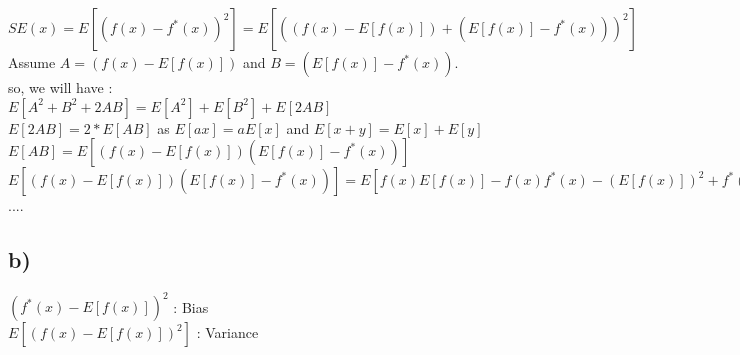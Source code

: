 \documentclass[10pt,a4paper]{article}
\begin{document}
$SE(x) = E[(f(x)-f^{*}(x))^{2}] = E[( (f(x)-E[f(x)]) +  (E[f(x)]-f^{*}(x)))^{2}]$\\
Assume $ A = (f(x)-E[f(x)])$ and $B = (E[f(x)]-f^{*}(x))$.\\
 so, we will have : \\
$E[A^2+B^2+ 2A B] = E[A^{2}] + E[B^{2}] + E[2 A B] $ \\
$E[2 A B] = 2 * E[A B]$  as $E[ax] = a E[x]$ and $E[x+y] = E[x]+E[y]$\\
$E[A B] = E[(f(x)-E[f(x)])(E[f(x)]-f^{*}(x))] $ \\
$E[ (f(x)-E[f(x)])(E[f(x)]-f^{*}(x))] = E[f(x)E[f(x)] - f(x)f^*(x) - (E[f(x)])^{2} + f^{*}(x) E[f(x)] ] = E[f(x).E[f(x)]] - E[f(x).f^{*}(x)] - E[ (E[f(x)])^{2}]  + E[E[f(x)].f^{*}(x)] $ \\
....

\subsection*{b)}
$(f^{*}(x)-E[f(x)])^{2}$ : Bias\\
$E [(f(x)-E[f(x)])^{2}]$ : Variance \\
\end{document}
